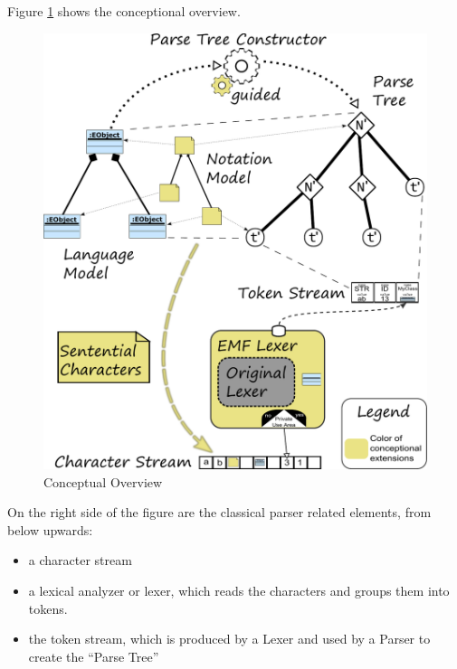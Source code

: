Figure \ref{ConceptFigure} shows the conceptional overview.
\begin{figure}
\centering
\includegraphics[scale=0.75]{gfx/ex/Concept} 
\caption{Conceptual Overview}
\label{ConceptFigure}
\end{figure}
On the right side of the figure are the classical parser related elements, from below upwards:
\begin{itemize}
	\item a character stream
	\item a lexical analyzer or lexer, which reads the characters and groups them into tokens.
	\item the token stream, which is produced by a Lexer and used by a Parser to create the ``Parse Tree''
\end{itemize}


